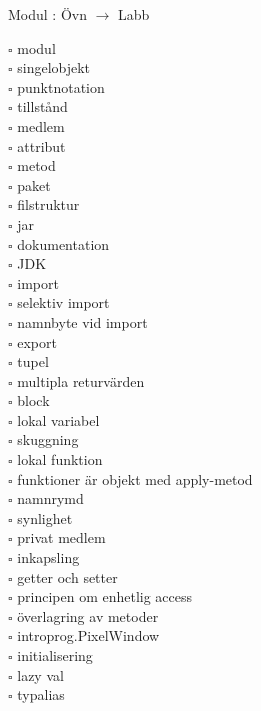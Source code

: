 
    Modul : Övn  $\rightarrow$ Labb 
    \begin{multicols}{3}\SlideFontTiny
    $\square$ modul \\
$\square$ singelobjekt \\
$\square$ punktnotation \\
$\square$ tillstånd \\
$\square$ medlem \\
$\square$ attribut \\
$\square$ metod \\
$\square$ paket \\
$\square$ filstruktur \\
$\square$ jar \\
$\square$ dokumentation \\
$\square$ JDK \\
$\square$ import \\
$\square$ selektiv import \\
$\square$ namnbyte vid import \\
$\square$ export \\
$\square$ tupel \\
$\square$ multipla returvärden \\
$\square$ block \\
$\square$ lokal variabel \\
$\square$ skuggning \\
$\square$ lokal funktion \\
$\square$ funktioner är objekt med apply-metod \\
$\square$ namnrymd \\
$\square$ synlighet \\
$\square$ privat medlem \\
$\square$ inkapsling \\
$\square$ getter och setter \\
$\square$ principen om enhetlig access \\
$\square$ överlagring av metoder \\
$\square$ introprog.PixelWindow \\
$\square$ initialisering \\
$\square$ lazy val \\
$\square$ typalias \\
    \end{multicols}
    